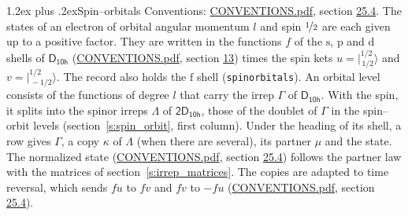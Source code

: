 \documentclass[10pt,a4paper]{article}
\makeatletter
\renewcommand\section{\@startsection{section}{1}{\z@}{-3ex plus -1ex minus -.2ex}%
  {1.2ex plus .2ex}{\normalfont\large\sffamily\bfseries\color{parttitle}}}
\numberwithin{equation}{section}
\newcommand{\grp}[1]{\mathsf{#1}}
\newcommand{\orbital}[1]{\mathrm{#1}}
\newcommand{\mult}{\kappa}
\newcommand{\intx}{\mu}
\newcommand{\jm}[2]{\bigl\lvert{}^{#1}_{\,#2}\bigr\rangle}
\makeatother
\begin{document}
\section{Spin--orbitals}\label{s:spin_orbitals}
Conventions: \href{../../CONVENTIONS.pdf}{CONVENTIONS.pdf}, section \href{../../CONVENTIONS.pdf\#conv.25.4}{25.4}.
\leavevmode\label{n:index.orbital.l}The states of an electron of orbital angular momentum $l$ and spin $\nicefrac{1}{2}$ are each given up to a positive factor. \label{n:local.spinor.uv}\label{n:local.function.f}They are written in the functions $f$ of the $\orbital{s}$, $\orbital{p}$ and $\orbital{d}$ shells of \href{../../../rotation/data/pdf/D10h.pdf}{$\grp{D_{10h}}$} (\href{../../CONVENTIONS.pdf}{CONVENTIONS.pdf}, section \href{../../../rotation/CONVENTIONS.pdf\#conv.13}{13}) times the spin kets $u = \jm{1/2}{1/2}$ and $v = \jm{1/2}{-1/2}$. The record also holds the $\orbital{f}$ shell (\texttt{spinorbitals}). An orbital level consists of the functions of degree $l$ that carry the irrep $\Gamma$ of \href{../../../rotation/data/pdf/D10h.pdf}{$\grp{D_{10h}}$}. With the spin, it splits into the spinor irreps $\Lambda$ of $\grp{2D_{10h}}$, those of the doublet of $\Gamma$ in the spin--orbit levels (section~\ref{s:spin_orbit}, first column). \label{n:head.state}Under the heading of its shell, a row gives $\Gamma$, a copy $\mult$ of $\Lambda$ (when there are several), its partner $\intx$ and the state. The normalized state (\href{../../CONVENTIONS.pdf}{CONVENTIONS.pdf}, section \href{../../CONVENTIONS.pdf\#conv.25.4}{25.4}) follows the partner law with the matrices of section~\ref{s:irrep_matrices}. The copies are adapted to time reversal, which sends $f u$ to $f v$ and $f v$ to $-f u$ (\href{../../CONVENTIONS.pdf}{CONVENTIONS.pdf}, section \href{../../CONVENTIONS.pdf\#conv.25.4}{25.4}).
\end{document}
